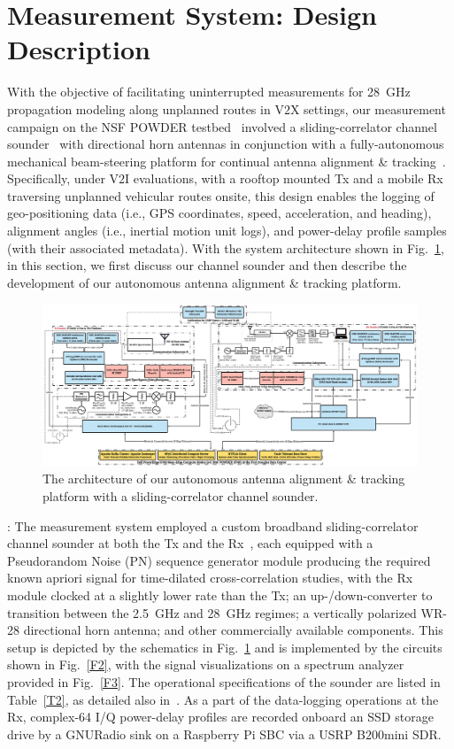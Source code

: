 \documentclass[12pt, draftcls, onecolumn]{IEEEtran}
\begin{document}
\section{Measurement System: Design Description}\label{S2}
With the objective of facilitating uninterrupted measurements for \SI{28}{\giga\hertz} propagation modeling along unplanned routes in V$2$X settings, our measurement campaign on the NSF POWDER testbed~\cite{POWDER} involved a sliding-correlator channel sounder~\cite{Purdue} with directional horn antennas in conjunction with a fully-autonomous mechanical beam-steering platform for continual antenna alignment \& tracking~\cite{SPAVE_NRSM}. Specifically, under V$2$I evaluations, with a rooftop mounted Tx and a mobile Rx traversing unplanned vehicular routes onsite, this design enables the logging of geo-positioning data (i.e., GPS coordinates, speed, acceleration, and heading), alignment angles (i.e., inertial motion unit logs), and power-delay profile samples (with their associated metadata). With the system architecture shown in Fig.~\ref{F1}, in this section, we first discuss our channel sounder and then describe the development of our autonomous antenna alignment \& tracking platform.
\begin{figure} [t]
    \centering
    \includegraphics[width=1.0\textwidth]{figs/system_architecture.jpg}
    \vspace{-6mm}
    \caption{The architecture of our autonomous antenna alignment \& tracking platform with a sliding-correlator channel sounder.}
    \label{F1}
\end{figure}

: The measurement system employed a custom broadband sliding-correlator channel sounder at both the Tx and the Rx~\cite{Purdue}, each equipped with a Pseudorandom Noise (PN) sequence generator module producing the required known apriori signal for time-dilated cross-correlation studies, with the Rx module clocked at a slightly lower rate than the Tx; an up-/down-converter to transition between the \SI{2.5}{\giga\hertz} and \SI{28}{\giga\hertz} regimes; a vertically polarized WR-28 directional horn antenna; and other commercially available components. This setup is depicted by the schematics in Fig.~\ref{F1} and is implemented by the circuits shown in Fig.~\ref{F2}, with the signal visualizations on a spectrum analyzer provided in Fig.~\ref{F3}. The operational specifications of the sounder are listed in Table~\ref{T2}, as detailed also in~\cite{Purdue}. As a part of the data-logging operations at the Rx, complex-\SI{64}{} I/Q power-delay profiles are recorded onboard an SSD storage drive by a GNURadio sink on a Raspberry Pi SBC via a USRP B$200$mini SDR.
\end{document}
